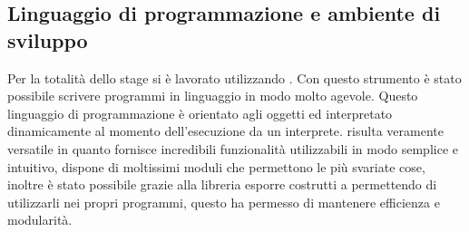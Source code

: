 \subsection{Linguaggio di programmazione e ambiente di sviluppo}
Per la totalità dello stage si è lavorato utilizzando . Con questo strumento è stato possibile scrivere programmi in linguaggio  in modo molto agevole. Questo linguaggio di programmazione è orientato agli oggetti ed interpretato dinamicamente al momento dell'esecuzione da un interprete.  risulta veramente versatile in quanto fornisce incredibili funzionalità utilizzabili in modo semplice e intuitivo, dispone di moltissimi moduli che permettono le più svariate cose, inoltre è stato possibile grazie alla libreria  esporre costrutti  a  permettendo di utilizzarli nei propri programmi, questo ha permesso di mantenere efficienza e modularità.
	

